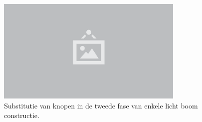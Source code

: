 \begin{figure}
  \centering
  \includegraphics[width=0.8\textwidth]{./img/raw/placeholder.png}
  \caption{Substitutie van knopen in de tweede fase van enkele licht boom constructie.}
  \label{fig:hs-substitutie}
\end{figure}
